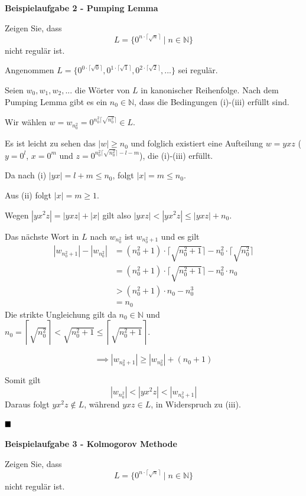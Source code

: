 \documentclass[a4paper, 11pt]{article}
\def\N{\mathbb{N}}
\newcommand\myTitle[1]{{\large \textbf {#1}}}
\begin{document}
    \myTitle{Beispielaufgabe 2 - Pumping Lemma}

    Zeigen Sie, dass 
    $$L = \{0^{n\cdot \lceil \sqrt{n}\rceil} \mid n \in \N\}$$ 
    nicht regulär ist.

    Angenommen $L = \{0^{0\cdot \lceil \sqrt{0}\rceil}, 0^{1\cdot \lceil \sqrt{1}\rceil}, 0^{2\cdot \lceil \sqrt{2}\rceil}, ...\}$ sei regulär.

    Seien  $w_0, w_1, w_2, ...$ die Wörter von $L$ in kanonischer Reihenfolge. 
    Nach dem Pumping Lemma gibt es ein $n_0 \in \N$, dass die Bedingungen (i)-(iii) erfüllt sind.

    Wir wählen $w = w_{n_0^2} = 0^{n_0^2\lceil\sqrt{n_0^2}\rceil} \in L$. 
    
    Es ist leicht zu sehen das $|w| \geq n_0$ und folglich existiert eine Aufteilung $w = yxz$ ($y = 0^l$, $x = 0^m$ und $z = 0^{n_0^2\lceil\sqrt{n_0^2}\rceil-l-m}$), die (i)-(iii) erfüllt. 
    
    Da nach (i) $|yx| = l + m \leq n_0$, folgt $|x| = m \leq n_0$.

    Aus (ii) folgt $|x| = m \geq 1$.

    Wegen $|yx^2z| = |yxz| + |x|$ gilt also $|yxz| < |yx^2z| \leq |yxz| + n_0$.

    Das nächste Wort in $L$ nach $w_{n_0^2}$ ist $w_{n_0^2+1}$ und es gilt
    \begin{align*}
        |w_{n_0^2+1}| - |w_{n_0^2}| &= (n_0^2+1)\cdot \lceil\sqrt{n_0^2 + 1}\rceil - n_0^2 \cdot \lceil\sqrt{n_0^2}\rceil\\
        &= (n_0^2+1)\cdot\lceil\sqrt{n_0^2+1}\rceil - n_0^2 \cdot n_0\\
        &> (n_0^2+1)\cdot n_0 - n_0^3\\
        &= n_0
    \end{align*}
    Die strikte Ungleichung gilt da $n_0 \in \N$ und $n_0 = \left\lceil\sqrt{n_0^2}\right\rceil < \sqrt{n_0^2+1} \leq \left\lceil\sqrt{n_0^2+1}\right\rceil$.

    $$\implies |w_{n_0^2+1}| \geq |w_{n_0^2}| + (n_0 + 1)$$

    Somit gilt 
    $$|w_{n_0^2}| < |yx^2z| < |w_{n_0^2+1}|$$
    Daraus folgt $yx^2z \notin L$, während $yxz \in L$, in Widerspruch zu (iii).

    $\hfill\blacksquare$



    \myTitle{Beispielaufgabe 3 - Kolmogorov Methode}

    Zeigen Sie, dass 
    $$L = \{0^{n\cdot \lceil \sqrt{n}\rceil} \mid n \in \N\}$$ 
    nicht regulär ist.
\end{document}
